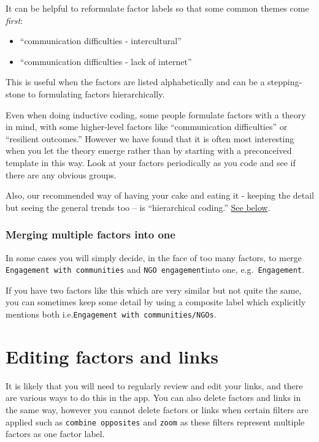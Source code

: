 \documentclass[
]{book}
\providecommand{\tightlist}{%
  \setlength{\itemsep}{0pt}\setlength{\parskip}{0pt}}
\begin{document}
It can be helpful to reformulate factor labels so that some common themes come \emph{first}:

\begin{itemize}
\tightlist
\item
  ``communication difficulties - intercultural''
\item
  ``communication difficulties - lack of internet''
\end{itemize}

This is useful when the factors are listed alphabetically and can be a stepping-stone to formulating factors hierarchically.

Even when doing inductive coding, some people formulate factors with a theory in mind, with some higher-level factors like ``communication difficulties'' or ``resilient outcomes.'' However we have found that it is often most interesting when you let the theory emerge rather than by starting with a preconceived template in this way. Look at your factors periodically as you code and see if there are any obvious groups.

Also, our recommended way of having your cake and eating it - keeping the detail but seeing the general trends too -- is ``hierarchical coding.'' \href{https://guide.causalmap.app/creating.html\#simplifying-causal-maps-with-hierarchical-coding}{See below}.

\hypertarget{merging-multiple-factors-into-one}{%
\subsection{Merging multiple factors into one}\label{merging-multiple-factors-into-one}}

In some cases you will simply decide, in the face of too many factors, to merge \texttt{Engagement\ with\ communities} and \texttt{NGO\ engagement}into one, e.g.~\texttt{Engagement}.

If you have two factors like this which are very similar but not quite the same, you can sometimes keep some detail by using a composite label which explicitly mentions both i.e.\texttt{Engagement\ with\ communities/NGOs}.

\hypertarget{xedit-factor-and-links}{%
\chapter{Editing factors and links}\label{xedit-factor-and-links}}

It is likely that you will need to regularly review and edit your links, and there are various ways to do this in the app. You can also delete factors and links in the same way, however you cannot delete factors or links when certain filters are applied such as \texttt{combine\ opposites} and \texttt{zoom} as these filters represent multiple factors as one factor label.
\end{document}

